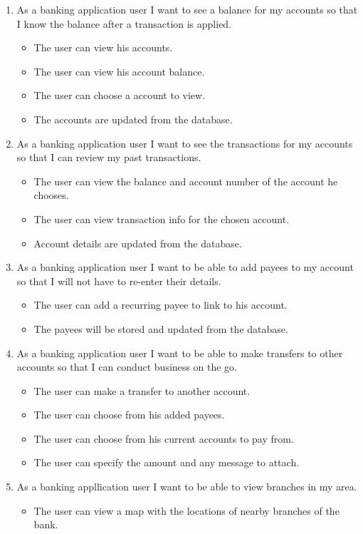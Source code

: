 \begin{itemize}
        \begin{enumerate}
        \item As a banking application user I want to see a balance for my accounts so that I know the balance after a transaction is applied. \cite{userStories}
            \begin{itemize}
                \item The user can view his accounts.
                \item The user can view his account balance.
                \item The user can choose a account to view.
                \item The accounts are updated from the database.
            \end{itemize}
        \item As a banking application user I want to see the transactions for my accounts so that I can review my past transactions.
            \begin{itemize}
                \item The user can view the balance and account number of the account he chooses.
                \item The user can view transaction info for the chosen account.
                \item Account details are updated from the database.
            \end{itemize}
        \item As a banking application user I want to be able to add payees to my account so that I will not have to re-enter their details.
            \begin{itemize}
                \item The user can add a recurring payee to link to his account.
                \item The payees will be stored and updated from the database.
            \end{itemize}
        \item As a banking application user I want to be able to make transfers to other accounts so that I can conduct business on the go.
            \begin{itemize}
                \item The user can make a transfer to another account.
                \item The user can choose from his added payees.
                \item The user can choose from his current accounts to pay from.
                \item The user can specify the amount and any message to attach.
            \end{itemize}
        \item As a banking appllication user I want to be able to view branches in my area.
            \begin{itemize}
                \item The user can view a map with the locations of nearby branches of the bank.
            \end{itemize}
        \end{enumerate}
    \end{itemize}

